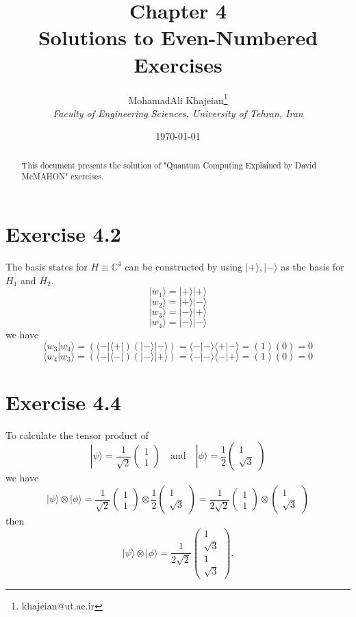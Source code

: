 \documentclass[12pt]{article}
\title{\textbf{Chapter 4} \\ \small Solutions to Even-Numbered Exercises}
\author{
    MohamadAli Khajeian\footnote{khajeian@ut.ac.ir} \\ 
    \small \textit{Faculty of Engineering Sciences, University of Tehran, Iran} \\ 
}
\date{\today}
\begin{document}
\maketitle

\begin{abstract}
    This document presents the solution of "Quantum Computing Explained by David McMAHON" exercises.
\end{abstract}

\section*{Exercise 4.2}
The basis states for \( H \equiv \mathbb{C}^4 \) can be constructed by using \( |+\rangle, |-\rangle \) as the basis for \( H_1 \) and \( H_2 \).
\begin{equation*}
|w_1\rangle = |+\rangle|+\rangle
\end{equation*}
\begin{equation*}
|w_2\rangle = |+\rangle|-\rangle
\end{equation*}
\begin{equation*}
|w_3\rangle = |-\rangle|+\rangle 
\end{equation*}
\begin{equation*}
|w_4\rangle = |-\rangle|-\rangle
\end{equation*}
we have
\[
\langle w_3 | w_4 \rangle = (\langle -| \langle +|)(|- \rangle |- \rangle) = \langle -|- \rangle \langle +|- \rangle = (1)(0) = 0
\]
\[
\langle w_4 | w_3 \rangle = (\langle -| \langle -|)(|- \rangle |+\rangle) = \langle -|- \rangle \langle -|+\rangle = (1)(0) = 0
\]
\section*{Exercise 4.4}
To calculate the tensor product of
\[
|\psi\rangle = \frac{1}{\sqrt{2}} \begin{pmatrix} 1 \\ 1 \end{pmatrix} \quad \text{and} \quad |\phi\rangle = \frac{1}{2} \begin{pmatrix} 1 \\ \sqrt{3} \end{pmatrix}
\]
we have
\[
|\psi\rangle \otimes |\phi\rangle = \frac{1}{\sqrt{2}} \begin{pmatrix} 1 \\ 1 \end{pmatrix} \otimes \frac{1}{2} \begin{pmatrix} 1 \\ \sqrt{3} \end{pmatrix} = \frac{1}{2\sqrt{2}} \begin{pmatrix} 1 \\ 1 \end{pmatrix} \otimes \begin{pmatrix} 1 \\ \sqrt{3} \end{pmatrix}
\]
then
\[
|\psi\rangle \otimes |\phi\rangle = \frac{1}{2\sqrt{2}} \begin{pmatrix} 1 \\ \sqrt{3} \\ 1 \\ \sqrt{3} \end{pmatrix}.
\]
\end{document}
